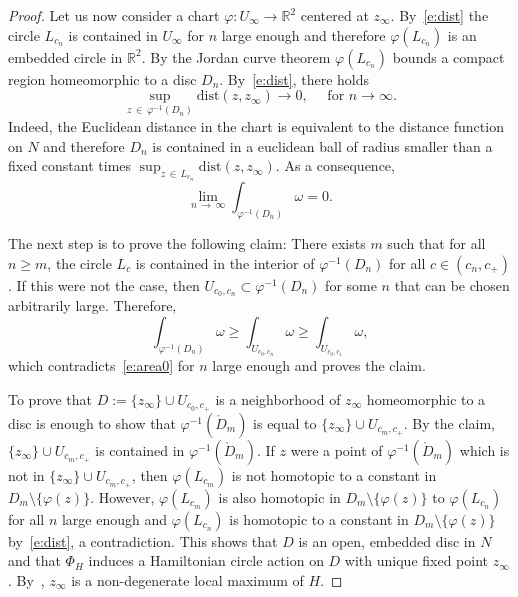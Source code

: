 \documentclass[AHL,Unicode,longabstracts,published]{cedram}
\newcommand{\R}{\mathbb{R}}
\newcommand{\dist}{\mathrm{dist}}
\begin{document}
\begin{proof}
Let us now consider a chart $\varphi:U_\infty\to\R^2$ centered at $z_\infty$. By~\eqref{e:dist} the circle $L_{c_n}$ is contained in $U_\infty$ for $n$ large enough and therefore $\varphi(L_{c_n})$ is an embedded circle in $\R^2$. By the Jordan curve theorem $\varphi(L_{c_n})$ bounds a compact region homeomorphic to a disc $D_n$. By~\eqref{e:dist}, there holds
\begin{equation}\label{e:dist0}
\sup_{z\,\in\,\varphi^{-1}(D_n)}\dist\left(z,z_\infty\right)\to0,\quad \text{ for }n\to\infty.
\end{equation}
Indeed, the Euclidean distance in the chart is equivalent to the distance function on $N$ and therefore $D_n$ is contained in a euclidean ball of radius smaller than a fixed constant times $\sup_{z\,\in\,L_{c_n}}\dist(z,z_\infty)$. As a consequence,
\begin{equation}\label{e:area0}
\lim_{n\,\to\,\infty}\int_{\varphi^{-1}(D_n)}\omega=0.
\end{equation}

The next step is to prove the following claim: There exists $m$ such that for all $n\geq m$, the circle $L_c$ is contained in the interior of $\varphi^{-1}(D_n)$ for all $c\in(c_n,c_+)$. If this were not the case, then $U_{c_0,c_n}\subset\varphi^{-1}(D_n)$ for some $n$ that can be chosen arbitrarily large. Therefore,
\[
\int_{\varphi^{-1}\left(D_n\right)}\omega\geq \int_{U_{c_0,c_n}}\omega\geq \int_{U_{c_0,c_1}}\omega,
\]
which contradicts~\eqref{e:area0} for $n$ large enough and proves the claim.

To prove that $D:=\{z_\infty\}\cup U_{c_0,c_+}$ is a neighborhood of $z_\infty$ homeomorphic to a disc is enough to show that $\varphi^{-1}(\mathring D_m)$ is equal to $\{z_\infty\}\cup U_{c_m,c_+}$. By the claim, $\{z_\infty\}\cup U_{c_m,c_+}$ is contained in $\varphi^{-1}(\mathring D_m)$. If $z$ were a point of $\varphi^{-1}(\mathring D_m)$ which is not in $\{z_\infty\}\cup U_{c_m,c_+}$, then $\varphi(L_{c_m})$ is not homotopic to a constant in $D_m\setminus\{\varphi(z)\}$. However, $\varphi(L_{c_m})$ is also homotopic in $D_m\setminus\{\varphi(z)\}$ to $\varphi(L_{c_n})$ for all $n$ large enough and $\varphi(L_{c_n})$ is homotopic to a constant in $D_m\setminus\{\varphi(z)\}$ by~\eqref{e:dist}, a contradiction. This shows that $D$ is an open, embedded disc in $N$ and that $\Phi_H$ induces a Hamiltonian circle action on $D$ with unique fixed point $z_\infty$. By~\cite[Lemma~5.5.8]{McDuff:1998uu}, $z_\infty$ is a non-degenerate local maximum of $H$.
\end{proof}
\end{document}
